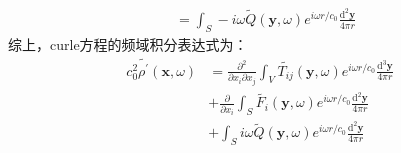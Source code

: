 \begin{enumerate}
\begin{equation}
\begin{aligned}
                &= \int_{S} - i \omega \widetilde{Q}(\mathbf{y}, \omega) e^{i \omega r / c_{0}} \frac{\mathrm{d}^{2} \mathbf{y}}{4 \pi r}
            \end{aligned}
        \end{equation}
        综上，curle方程的频域积分表达式为：
        \begin{equation}
            \begin{aligned}
                c_{0}^{2} \tilde{\rho^{\prime}}(\mathbf{x}, \omega)
                &= \frac{\partial^{2}}{\partial x_{i} \partial x_{j}} \int_{V} \widetilde{T_{i j}}(\mathbf{y}, \omega) e^{i \omega r / c_{0}} \frac{\mathrm{d}^{3} \mathbf{y}}{4 \pi r} \\
                &+ \frac{\partial}{\partial x_{i}} \int_{S} \widetilde{F_{i}}(\mathbf{y}, \omega) e^{i \omega r / c_{0}} \frac{\mathrm{d}^{2} \mathbf{y}}{4 \pi r} \\
                &+ \int_{S} i \omega \widetilde{Q}(\mathbf{y}, \omega) e^{i \omega r / c_{0}} \frac{\mathrm{d}^{2} \mathbf{y}}{4 \pi r}
            \end{aligned}
        \end{equation}
\end{enumerate}

\clearpage